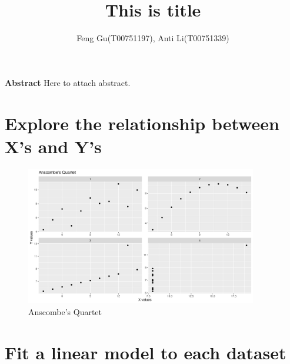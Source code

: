 \documentclass[12pt]{article}
\title{
This is title
}
\author{Feng Gu(T00751197), Anti Li(T00751339)}
\begin{document}
\maketitle

\begin{center}
    \textbf{\large Abstract}
    Here to attach abstract.
\end{center}

\section{Explore the relationship between X's and Y's}

\lipsum[1-2]

\begin{figure}[!h]
    \centering
    \includegraphics[width=0.9\textwidth]{../results/anscombe_quartet.png}
    \caption{Anscombe's Quartet}
    \label{fig:anscombe_quartet}
\end{figure}

\section{Fit a linear model to each dataset}

\lipsum[1-2]
\end{document}
